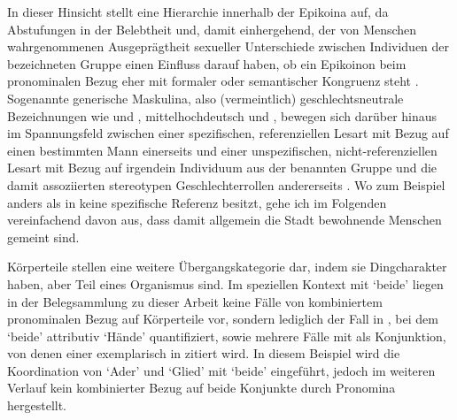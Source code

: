 In dieser Hinsicht stellt \citet[172--174]{klein2022} eine Hierarchie innerhalb
der Epikoina auf, da Abstufungen in der Belebtheit und, damit einhergehend, der
von Menschen wahrgenommenen Ausgeprägtheit sexueller Unterschiede zwischen
Individuen der bezeichneten Gruppe einen Einfluss darauf haben, ob ein
Epikoinon beim pronominalen Bezug eher mit formaler oder semantischer Kongruenz
steht \autocite[vgl.~auch][74--83]{kotthoffnuebling2018}. Sogenannte generische
Maskulina, also (vermeintlich) geschlechtsneutrale Bezeichnungen wie
 und , mittelhochdeutsch
 und , bewegen sich darüber hinaus im Spannungsfeld
zwischen einer spezifischen, referenziellen Lesart mit Bezug auf einen
bestimmten Mann einerseits und einer unspezifischen, nicht-referenziellen
Lesart mit Bezug auf irgendein Individuum aus der benannten Gruppe und die
damit assoziierten stereotypen Geschlechterrollen andererseits
\autocites[91--122]{kotthoffnuebling2018}[159--160, 179--180]{klein2022}. Wo
zum Beispiel  anders als in  keine
spezifische Referenz besitzt, gehe ich im Folgenden vereinfachend davon aus,
dass damit allgemein die Stadt bewohnende Menschen gemeint sind.


Körperteile stellen eine weitere Übergangskategorie dar, indem sie
Dingcharakter haben, aber Teil eines Organismus sind. Im speziellen Kontext mit
 `beide' liegen in der Belegsammlung zu dieser Arbeit keine
Fälle von kombiniertem pronominalen Bezug auf Körperteile vor, sondern
lediglich der Fall in , bei dem 
`beide' attributiv  `Hände' quantifiziert, sowie mehrere
Fälle mit  als Konjunktion, von denen einer exemplarisch in
 zitiert wird. In diesem Beispiel wird die Koordination
von  `Ader' und  `Glied' mit 
`beide' eingeführt, jedoch im weiteren Verlauf kein kombinierter Bezug auf
beide Konjunkte durch Pronomina hergestellt.

